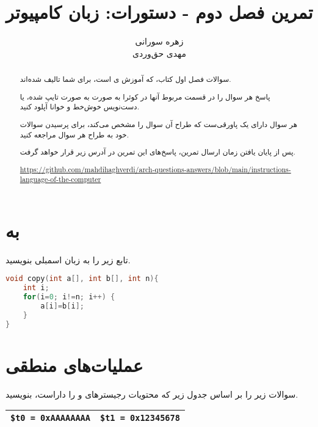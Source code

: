\documentclass[11pt, dvipsnames, svgnames, x11names]{article}
\title{تمرین فصل دوم - دستورات: زبان کامپیوتر}
\author{
    زهره سورانی \\
    مهدی‌ حق‌وردی}
\date{}
\begin{document}
\maketitle    
\begin{abstract}        
سوالات فصل اول کتاب، که آموزش ی  است، برای شما تالیف شده‌اند.

پاسخ هر سوال را در قسمت مربوط آنها در کوئرا به صورت  به صورت تایپ‌ شده، یا دست‌نویس خوش‌خط و خوانا آپلود کنید.               

هر سوال دارای یک پاورقی‌ست که طراح آن سوال را مشخص می‌کند، برای پرسیدن سوالات‌ خود به طراح هر سوال مراجعه کنید.               

پس از پایان‌ یافتن زمان ارسال تمرین، پاسخ‌های این تمرین در آدرس زیر قرار خواهد گرفت.
\begin{flushleft}
\url{https://github.com/mahdihaghverdi/arch-questions-answers/blob/main/instructions-language-of-the-computer}
\end{flushleft}

\end{abstract}
\tableofcontents
\newpage

\section{ به }
تابع زیر را به زبان اسمبلی بنویسید.
\begin{latin}
\begin{lstlisting}[language=c]
void copy(int a[], int b[], int n){
    int i;
    for(i=0; i!=n; i++) {
        a[i]=b[i];
    }
}
\end{lstlisting}
\end{latin}
\section{عملیات‌های منطقی}
سوالات زیر را بر اساس جدول زیر که محتویات رجیستر‌های 
و 
را داراست، بنویسید.

\begin{latin}
\begin{table}[H]
\begin{center}
\begin{tabular}{|c|c|}
\hline
\texttt{\$t0 = 0xAAAAAAAA} & \texttt{\$t1 = 0x12345678} \\
\hline
\end{tabular}
\end{center}
\end{table}
\end{latin}
\end{document}
